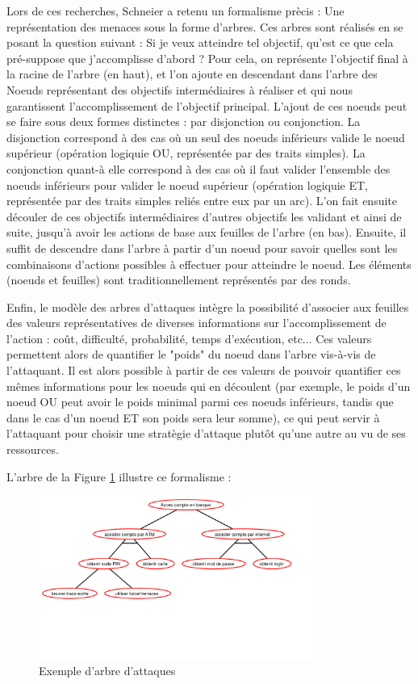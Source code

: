 		Lors de ces recherches, Schneier a retenu un formalisme prècis : Une représentation des menaces sous la forme d'arbres. Ces arbres sont réalisés en se posant la question suivant : Si je veux atteindre tel objectif, qu'est ce que cela pré-suppose que j'accomplisse d'abord ? Pour cela, on représente l'objectif final à la racine de l'arbre (en haut), et l'on ajoute en descendant dans l'arbre des Noeuds représentant des objectifs intermédiaires à réaliser et qui nous garantissent l'accomplissement de l'objectif principal. L'ajout de ces noeuds peut se faire sous deux formes distinctes : par disjonction ou conjonction. La disjonction correspond à des cas où un seul des noeuds inférieurs valide le noeud supérieur (opération logiquie OU, représentée par des traits simples). La conjonction quant-à elle correspond à des cas où il faut valider l'ensemble des noeuds inférieurs pour valider le noeud supérieur (opération logiquie ET, représentée par des traits simples reliés entre eux par un arc). L'on fait ensuite découler de ces objectifs intermédiaires d'autres objectifs les validant et ainsi de suite, jusqu'à avoir les actions de base aux feuilles de l'arbre (en bas). Ensuite, il suffit de descendre dans l'arbre à partir d'un noeud pour savoir quelles sont les combinaisons d'actions possibles à effectuer pour atteindre le noeud. Les éléments (noeuds et feuilles) sont traditionnellement représentés par des ronds.

		Enfin, le modèle des arbres d'attaques intègre la possibilité d'associer aux feuilles des valeurs représentatives de diverses informations sur l'accomplissement de l'action : coût, difficulté, probabilité, temps d'exécution, etc... Ces valeurs permettent alors de quantifier le "poids" du noeud dans l'arbre vis-à-vis de l'attaquant.  Il est alors possible à partir de ces valeurs de pouvoir quantifier ces mêmes informations pour les noeuds qui en découlent (par exemple, le poids d'un noeud OU peut avoir le poids minimal parmi ces noeuds inférieurs, tandis que dans le cas d'un noeud ET son poids sera leur somme), ce qui peut servir à l'attaquant pour choisir une stratègie d'attaque plutôt qu'une autre au vu de ses ressources.

		L'arbre de la Figure \ref{fig:arbre_exemple_1} illustre ce formalisme : 

		\begin{figure}
			\begin{center}
				\includegraphics[width=0.8\textwidth]{figure/exemple1_rapport.pdf}
			\end{center}
			\caption{Exemple d'arbre d'attaques}
			\label{fig:arbre_exemple_1}
		\end{figure}

